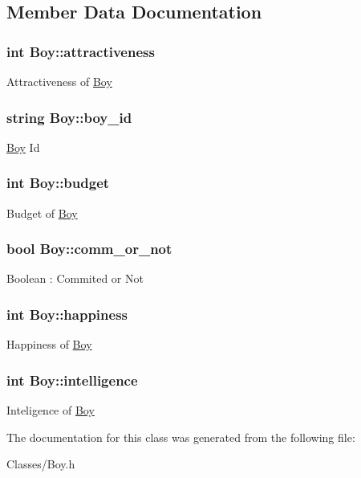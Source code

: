 \subsection{Member Data Documentation}
\hypertarget{class_boy_a679e59279116986aaae135d8a524bc46}{
\subsubsection[{attractiveness}]{\setlength{\rightskip}{0pt plus 5cm}int Boy\-::attractiveness}}\label{class_boy_a679e59279116986aaae135d8a524bc46}
Attractiveness of \hyperlink{class_boy}{Boy} \hypertarget{class_boy_a8a3bba4d4570b1e9d43a1f0c6a1eb7ed}{
\subsubsection[{boy\-\_\-id}]{\setlength{\rightskip}{0pt plus 5cm}string Boy\-::boy\-\_\-id}}\label{class_boy_a8a3bba4d4570b1e9d43a1f0c6a1eb7ed}
\hyperlink{class_boy}{Boy} Id \hypertarget{class_boy_a3b755250e77f892967872c7eb4c26685}{
\subsubsection[{budget}]{\setlength{\rightskip}{0pt plus 5cm}int Boy\-::budget}}\label{class_boy_a3b755250e77f892967872c7eb4c26685}
Budget of \hyperlink{class_boy}{Boy} \hypertarget{class_boy_a20bb3ae9a27e23227249cff68b0458e3}{
\subsubsection[{comm\-\_\-or\-\_\-not}]{\setlength{\rightskip}{0pt plus 5cm}bool Boy\-::comm\-\_\-or\-\_\-not}}\label{class_boy_a20bb3ae9a27e23227249cff68b0458e3}
Boolean \-: Commited or Not \hypertarget{class_boy_adaf15f15972678dbd77e8b8b319d5767}{
\subsubsection[{happiness}]{\setlength{\rightskip}{0pt plus 5cm}int Boy\-::happiness}}\label{class_boy_adaf15f15972678dbd77e8b8b319d5767}
Happiness of \hyperlink{class_boy}{Boy} \hypertarget{class_boy_a10f24ab1e3dbee6fac2a122c76954fa5}{
\subsubsection[{intelligence}]{\setlength{\rightskip}{0pt plus 5cm}int Boy\-::intelligence}}\label{class_boy_a10f24ab1e3dbee6fac2a122c76954fa5}
Inteligence of \hyperlink{class_boy}{Boy} 

The documentation for this class was generated from the following file\-:\begin{DoxyCompactItemize}
\item 
Classes/Boy.\-h\end{DoxyCompactItemize}
